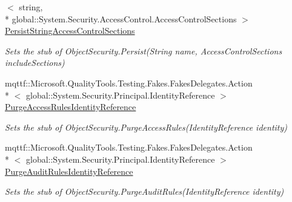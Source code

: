 \begin{DoxyCompactItemize}
$<$ string, \\*
global\-::\-System.\-Security.\-Access\-Control.\-Access\-Control\-Sections $>$ \hyperlink{class_system_1_1_security_1_1_access_control_1_1_fakes_1_1_stub_common_object_security_a34094fbefdb65cbb9e7700699bd62d3e}{Persist\-String\-Access\-Control\-Sections}
\begin{DoxyCompactList}\small\item\em Sets the stub of Object\-Security.\-Persist(\-String name, Access\-Control\-Sections include\-Sections)\end{DoxyCompactList}\item 
mqttf\-::\-Microsoft.\-Quality\-Tools.\-Testing.\-Fakes.\-Fakes\-Delegates.\-Action\\*
$<$ global\-::\-System.\-Security.\-Principal.\-Identity\-Reference $>$ \hyperlink{class_system_1_1_security_1_1_access_control_1_1_fakes_1_1_stub_common_object_security_a36886f1c5720c7962a38ca4d7e27131e}{Purge\-Access\-Rules\-Identity\-Reference}
\begin{DoxyCompactList}\small\item\em Sets the stub of Object\-Security.\-Purge\-Access\-Rules(\-Identity\-Reference identity)\end{DoxyCompactList}\item 
mqttf\-::\-Microsoft.\-Quality\-Tools.\-Testing.\-Fakes.\-Fakes\-Delegates.\-Action\\*
$<$ global\-::\-System.\-Security.\-Principal.\-Identity\-Reference $>$ \hyperlink{class_system_1_1_security_1_1_access_control_1_1_fakes_1_1_stub_common_object_security_a0114be0b76d3d3172cfe01b4c5947554}{Purge\-Audit\-Rules\-Identity\-Reference}
\begin{DoxyCompactList}\small\item\em Sets the stub of Object\-Security.\-Purge\-Audit\-Rules(\-Identity\-Reference identity)\end{DoxyCompactList}\end{DoxyCompactItemize}
